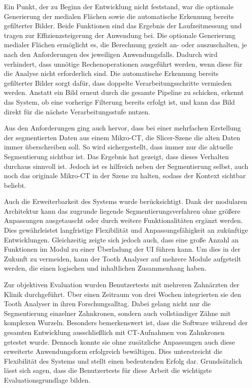 Ein Punkt, der zu Beginn der Entwicklung nicht feststand, war die optionale Generierung
der medialen Flächen sowie die automatische Erkennung bereits gefilterter Bilder.
Beide Funktionen sind das Ergebnis der Laufzeitmessung und tragen zur
Effizienzsteigerung der Anwendung bei. Die optionale Generierung medialer Flächen
ermöglicht es, die Berechnung gezielt an- oder auszuschalten, je nach den
Anforderungen des jeweiligen Anwendungsfalls. Dadurch wird verhindert, dass
unnötige Rechenoperationen ausgeführt werden, wenn diese für die Analyse nicht erforderlich
sind. Die automatische Erkennung bereits gefilterter Bilder sorgt dafür, dass doppelte
Verarbeitungsschritte vermieden werden. Anstatt ein Bild erneut durch die
gesamte Pipeline zu schicken, erkennt das System, ob eine vorherige Filterung
bereits erfolgt ist, und kann das Bild direkt für die nächste Verarbeitungsstufe
nutzen.

Aus den Anforderungen ging auch hervor, dass bei einer mehrfachen Erstellung der
segmentierten Daten aus einem Mikro-\ac{CT}, die Slicer-Szene die alten Daten
immer überschreiben soll. So wird sichergestellt, dass immer nur die aktuelle
Segmentierung sichtbar ist. Das Ergebnis hat gezeigt, dass dieses Verhalten
durchaus sinnvoll ist. Jedoch ist es hilfreich neben der Segmentierung selbst,
auch noch das originale Mikro-\ac{CT} in der Szene zu halten, sodass der Kontext
sichtbar beliebt.

Auch die Erweiterbarkeit des Systems wurde berücksichtigt. Dank der modularen Architektur
kann das zugrunde liegende Segmentierungsverfahren ohne größere Anpassungen ausgetauscht
oder durch weitere Funktionalitäten ergänzt werden. Dies gewährleistet
langfristige Flexibilität und Anpassungsfähigkeit an zukünftige Entwicklungen. Gleichzeitig
zeigte sich jedoch auch, dass eine große Anzahl an Funktionen im Modul zu einer
Überladung der \ac{UI} führen kann. Um dies in der Zukunft zu vermeiden, kann der
Tooth Analyser auf mehrere Module aufgeteilt werden, die einen logischen und
inhaltlichen Zusammenhang haben.

Zur objektiven Evaluation wurden Benutzertests mit mehreren Zahnärzten der
Klinik durchgeführt. Über einen Zeitraum von drei Wochen integrierten sie den Tooth
Analyser in ihren Forschungsalltag. Dabei gelang nicht nur die Segmentierung
einzelner Zahnkronen, sondern auch vollständiger Zähne mit komplexen Wurzeln.
Besonders bemerkenswert ist, dass die Software während der gesamten Entwicklung ausschließlich
mit \ac{CT}-Aufnahmen von Zahnkronen getestet wurde. Dennoch konnte sie ohne zusätzliche
Anpassungen auch diese erweiterte Anwendungsform erfolgreich bewältigen. Dies
unterstreicht die Flexibilität des Systems und stellt einen bedeutenden Erfolg
dar. Grundsätzlich lässt sich sagen, dass die Benutzertests für diese Arbeit die
wichtigste Evaluationsgrundlage bilden.

